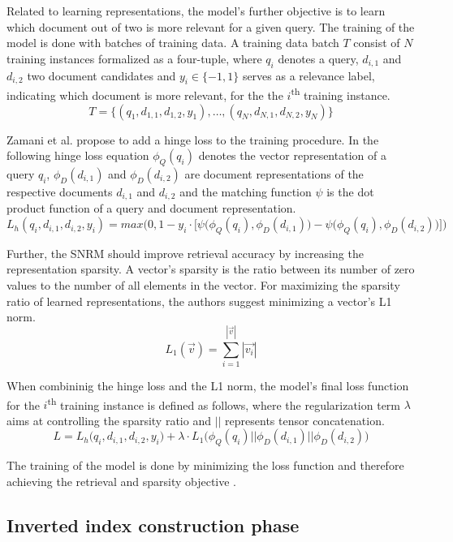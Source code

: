 Related to learning representations, the model's further objective is
    to learn which document out of two is more relevant for a given query.
The training of the model is done with batches of training data.
A training data batch $T$ consist of $N$ training instances
    formalized as a four-tuple, where
    $q_i$ denotes a query, 
    $d_{i,1}$ and $d_{i,2}$ two document candidates and
    $y_i \in \{-1,1\}$ serves as a relevance label, indicating which document
    is more relevant, for the the $i$\textsuperscript{th} training instance.
\[
T=\{ (q_1,d_{1,1},d_{1,2},y_1), \ldots, (q_N,d_{N,1},d_{N,2},y_N)\}
\]

Zamani et al. propose to add a hinge loss to the training procedure.
In the following hinge loss equation 
    $\phi_Q(q_i)$ denotes the vector representation of a query $q_i$,
    $\phi_D(d_{i,1})$ and $\phi_D(d_{i,2})$ are document representations 
    of the respective documents $d_{i,1}$ and $d_{i,2}$ and
    the matching function $\psi$ is the dot product function of a query and 
    document representation.
\[
L_{h}(q_i, d_{i,1}, d_{i,2}, y_i) = max\Big(0,1 - y_i \cdot \Big[ \psi\big(\phi_Q(q_i), \phi_D(d_{i,1})) - \psi(\phi_Q(q_i), \phi_D(d_{i,2})\big) \Big] \Big)
\]

Further, the SNRM should improve retrieval accuracy by increasing the representation 
    sparsity.
A vector's sparsity is the ratio between its number of zero values to 
    the number of all elements in the vector.
For maximizing the sparsity ratio of learned representations,
    the authors suggest minimizing a vector's L1 norm.
\[
L_1(\vec{v}) = \sum_{i=1}^{\left |  \vec{v}\right |} \left |  \vec{v_i}\right |
\]

When combininig the hinge loss and the L1 norm, the model's final loss function 
    for the $i$\textsuperscript{th} training instance is defined as follows,
    where the regularization term $\lambda$ aims at controlling the sparsity
    ratio and $||$ represents tensor concatenation.
\[
L = L_{h}\big(q_i, d_{i,1}, d_{i,2}, y_i\big) + \lambda \cdot L_1\big(\phi_Q(q_i) || \phi_D(d_{i,1}) || \phi_D(d_{i,2})\big)
\]

The training of the model is done by minimizing the loss function and therefore 
    achieving the retrieval and sparsity objective
    \cite{zamani:2018:from-neural-reranking-to-neural-ranking}.

\subsection*{Inverted index construction phase}

